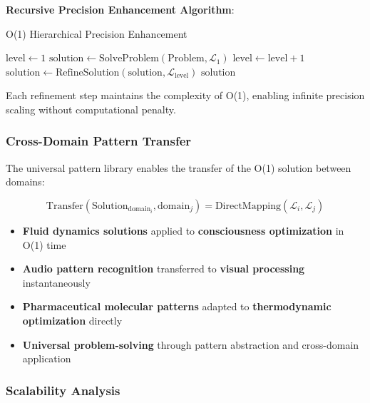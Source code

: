 \documentclass[11pt,a4paper]{article}
\theoremstyle{remark}
\begin{document}
\textbf{Recursive Precision Enhancement Algorithm}:

\begin{algorithm}
\caption{O(1) Hierarchical Precision Enhancement}
\begin{algorithmic}[1]
    \State $\text{level} \leftarrow 1$
    \State $\text{solution} \leftarrow \text{SolveProblem}(\text{Problem}, \mathcal{L}_1)$ 
        \State $\text{level} \leftarrow \text{level} + 1$
        \State $\text{solution} \leftarrow \text{RefineSolution}(\text{solution}, \mathcal{L}_{\text{level}})$ 
    \EndWhile
    \Return $\text{solution}$
\EndProcedure
\end{algorithmic}
\end{algorithm}

Each refinement step maintains the complexity of O(1), enabling infinite precision scaling without computational penalty.

\subsubsection{Cross-Domain Pattern Transfer}

The universal pattern library enables the transfer of the O(1) solution between domains:

\begin{equation}
\text{Transfer}(\text{Solution}_{\text{domain}_i}, \text{domain}_j) = \text{DirectMapping}(\mathcal{L}_i, \mathcal{L}_j)
\end{equation}

\begin{itemize}
\item \textbf{Fluid dynamics solutions} applied to \textbf{consciousness optimization} in O(1) time
\item \textbf{Audio pattern recognition} transferred to \textbf{visual processing} instantaneously
\item \textbf{Pharmaceutical molecular patterns} adapted to \textbf{thermodynamic optimization} directly
\item \textbf{Universal problem-solving} through pattern abstraction and cross-domain application
\end{itemize}


\subsubsection{Scalability Analysis}
\end{document}
